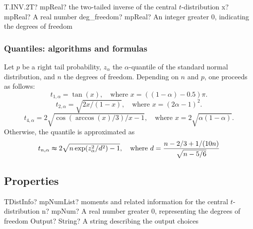 \vspace{0.6cm}
\begin{mpFunctionsExtract}
	\mpWorksheetFunctionTwoNotImplemented
	{T.INV.2T? mpReal? the two-tailed inverse of the central $t$-distribution}
	{x? mpReal? A real number}
	{deg\_freedom? mpReal? An integer  greater 0, indicating the degrees of freedom}
\end{mpFunctionsExtract}


\subsubsection{Quantiles: algorithms and formulas}
\label{tDistributionQuantileAlgorithm}


Let $p$ be a right tail probability, $z_\alpha$ the $\alpha$-quantile of the standard normal distribution, and $n$ the degrees of freedom. Depending on $n$ and $p$, one proceeds as follows:
\begin{equation}
t_{1,\alpha} = \tan(x), \quad \text{where } x=((1-\alpha)-0.5)\pi.
\end{equation}
\begin{equation}
t_{2,\alpha} = \sqrt{2x/(1-x)}, \quad \text{where } x=(2\alpha-1)^2.
\end{equation}
\begin{equation}
t_{4,\alpha} = 2\sqrt{\cos(\arccos(x)/3)/x-1}, \quad \text{where } x=2\sqrt{\alpha(1-\alpha)}.
\end{equation}
Otherwise, the quantile is approximated as \citep{peizerNormalPart1_1968}
\begin{equation}
t_{n,\alpha}  \thickapprox  2\sqrt{n\exp(z_{\alpha}^2/d^2)-1}, \quad \text{where } d=\frac{n-2/3+1/(10n)}{\sqrt{n-5/6}}
\end{equation}








\subsection{Properties}
\label{tDistributionProperties}

\begin{mpFunctionsExtract}
	\mpFunctionTwoNotImplemented
	{TDistInfo? mpNumList? moments and related information for the central $t$-distribution}
	{n? mpNum? A real number greater 0, representing the degrees of freedom}
	{Output? String? A string describing the output choices}
\end{mpFunctionsExtract}

